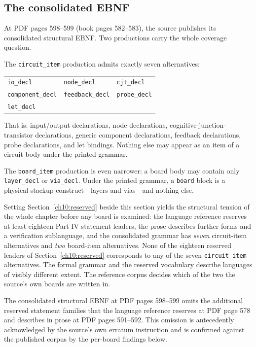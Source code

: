 \subsection{The consolidated EBNF}\label{ch10:ebnf}

At PDF pages 598--599 (book pages 582--583), the source publishes its consolidated structural EBNF. Two productions carry the whole coverage question.

The \texttt{circuit\_item} production admits exactly seven alternatives:

\begin{center}
\begin{tabular}{@{}lll@{}}
\toprule
\texttt{io\_decl} & \texttt{node\_decl} & \texttt{cjt\_decl} \\
\texttt{component\_decl} & \texttt{feedback\_decl} & \texttt{probe\_decl} \\
\texttt{let\_decl} & & \\
\bottomrule
\end{tabular}
\end{center}

That is: input/output declarations, node declarations, cognitive-junction-transistor declarations, generic component declarations, feedback declarations, probe declarations, and let bindings. Nothing else may appear as an item of a circuit body under the printed grammar.

The \texttt{board\_item} production is even narrower: a board body may contain only \texttt{layer\_decl} or \texttt{via\_decl}. Under the printed grammar, a \texttt{board} block is a physical-stackup construct---layers and vias---and nothing else.

Setting Section~\ref{ch10:reserved} beside this section yields the structural tension of the whole chapter before any board is examined: the language reference reserves at least eighteen Part-IV statement leaders, the prose describes further forms and a verification sublanguage, and the consolidated grammar has \emph{seven} circuit-item alternatives and \emph{two} board-item alternatives. None of the eighteen reserved leaders of Section~\ref{ch10:reserved} corresponds to any of the seven \texttt{circuit\_item} alternatives. The formal grammar and the reserved vocabulary describe languages of visibly different extent. The reference corpus decides which of the two the source's own boards are written in.

\begin{finding}\label{ch10:find-tension}
The consolidated structural EBNF at PDF pages 598--599 omits the additional reserved statement families that the language reference reserves at PDF page 578 and describes in prose at PDF pages 591--592. This omission is antecedently acknowledged by the source's own erratum instruction and is confirmed against the published corpus by the per-board findings below.
\end{finding}

